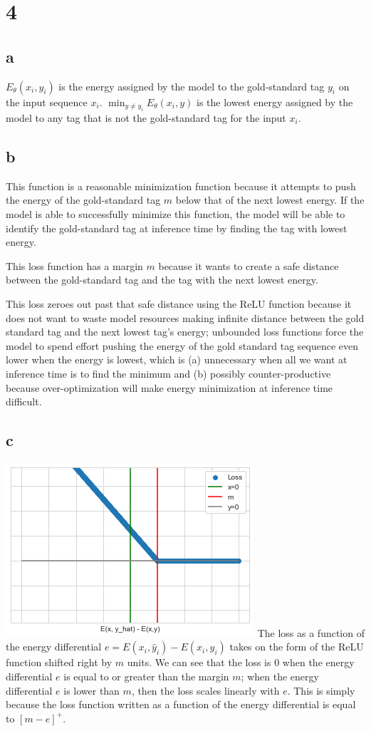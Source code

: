 \documentclass{article}
\begin{document}
\section{4}
\subsection{a}
$E_\theta (x_i, y_i)$ is the energy assigned by the model to the gold-standard tag $y_i$ on the input sequence $x_i$. $\min_{y \neq y_i} E_\theta (x_i, y)$ is the lowest energy assigned by the model to any tag that is not the gold-standard tag for the input $x_i$.  

\subsection{b}
This function is a reasonable minimization function because it attempts to push the energy of the gold-standard tag $m$ below that of the next lowest energy. If the model is able to successfully minimize this function, the model will be able to identify the gold-standard tag at inference time by finding the tag with lowest energy.

This loss function has a margin $m$ because it wants to create a safe distance between the gold-standard tag and the tag with the next lowest energy.

This loss zeroes out past that safe distance using the ReLU function because it does not want to waste model resources making infinite distance between the gold standard tag and the next lowest tag's energy; unbounded loss functions force the model to spend effort pushing the energy of the gold standard tag sequence even lower when the energy is lowest, which is (a) unnecessary when all we want at inference time is to find the minimum and (b) possibly counter-productive because over-optimization will make energy minimization at inference time difficult.

\subsection{c}
\includegraphics{relu}
The loss as a function of the energy differential $e = E(x_i, \hat{y}_i) - E(x_i, y_i)$ takes on the form of the ReLU function shifted right by $m$ units. We can see that the loss is 0 when the energy differential $e$ is equal to or greater than the margin $m$; when the energy differential $e$ is lower than $m$, then the loss scales linearly with $e$. This is simply because the loss function written as a function of the energy differential is equal to $[m - e]^+$.
\end{document}
